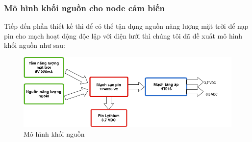 \subsubsection*{Mô hình khối nguồn cho node cảm biến}
Tiếp đến phần thiết kế thì để có thể tận dụng nguồn năng lượng mặt trời để nạp pin cho mạch hoạt động độc lập với điện lưới thì chúng tôi đã đề xuất mô hình khối nguồn như sau:
\begin{figure}[H]
	\centering    
	\includegraphics[width=6in]{khoinguon}
	\caption[Mô hình khối nguồn]{Mô hình khối nguồn}
	\label{fig:khoinguon}
\end{figure}

